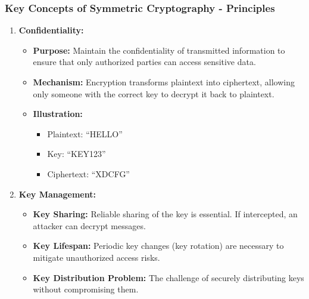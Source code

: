 \documentclass{beamer}
\begin{document}
\begin{frame}[fragile]
    \frametitle{Key Concepts of Symmetric Cryptography - Principles}
    \begin{enumerate}
        \item \textbf{Confidentiality:}
            \begin{itemize}
                \item \textbf{Purpose:} Maintain the confidentiality of transmitted information to ensure that only authorized parties can access sensitive data.
                \item \textbf{Mechanism:} Encryption transforms plaintext into ciphertext, allowing only someone with the correct key to decrypt it back to plaintext.
                \item \textbf{Illustration:}
                    \begin{itemize}
                        \item Plaintext: ``HELLO''
                        \item Key: ``KEY123''
                        \item Ciphertext: ``XDCFG''
                    \end{itemize}
            \end{itemize}

        \item \textbf{Key Management:}
            \begin{itemize}
                \item \textbf{Key Sharing:} Reliable sharing of the key is essential. If intercepted, an attacker can decrypt messages.
                \item \textbf{Key Lifespan:} Periodic key changes (key rotation) are necessary to mitigate unauthorized access risks.
                \item \textbf{Key Distribution Problem:} The challenge of securely distributing keys without compromising them.
            \end{itemize}
    \end{enumerate}
\end{frame}
\end{document}
